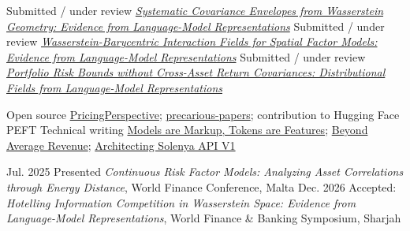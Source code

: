 \begin{cvskills}
  \cvskill
  {Submitted / under review}
  {\href{https://arxiv.org/abs/2410.23447}{\textit{Systematic
        Covariance Envelopes from Wasserstein Geometry: Evidence from
  Language-Model Representations}}}
  \cvskill
  {Submitted / under review}
  {\href{https://arxiv.org/abs/2608.21699}{\textit{Wasserstein-Barycentric
        Interaction Fields for Spatial Factor Models: Evidence from
  Language-Model Representations}}}
  \cvskill
  {Submitted / under review}
  {\href{https://arxiv.org/abs/2608.21706}{\textit{Portfolio Risk
        Bounds without Cross-Asset Return Covariances: Distributional
  Fields from Language-Model Representations}}}
\end{cvskills}

\begin{cvskills}
  \cvskill
  {Open source}
  {\href{https://github.com/marcusinthesky/PricingPerspective}{PricingPerspective};
    \href{https://github.com/marcusinthesky/precarious-papers}{precarious-papers};
  contribution to Hugging Face PEFT}
  \cvskill
  {Technical writing}
  {\href{https://huggingface.co/blog/marcusinthesky/models-are-markup-tokens-are-features}{Models
    are Markup, Tokens are Features};
    \href{https://www.solenya.ai/blog/24-ab-test-myrunway}{Beyond
    Average Revenue};
    \href{https://www.solenya.ai/blog/23-ingredients-and-engine}{Architecting
  Solenya API V1}}
\end{cvskills}

\begin{cvskills}
  \cvskill
  {Jul. 2025}
  {Presented \textit{Continuous Risk Factor Models: Analyzing Asset
  Correlations through Energy Distance}, World Finance Conference, Malta}
  \cvskill
  {Dec. 2026}
  {Accepted: \textit{Hotelling Information Competition in Wasserstein
    Space: Evidence from Language-Model Representations}, World Finance
  \& Banking Symposium, Sharjah}
\end{cvskills}
